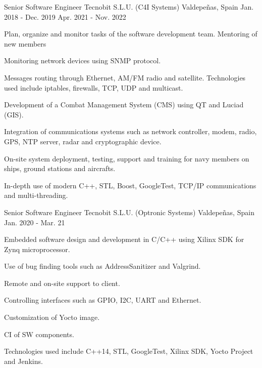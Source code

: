 

\begin{cventries}

  \cventry
    {Senior Software Engineer} %
    {Tecnobit S.L.U. (C4I Systems)} %
    {Valdepeñas, Spain} %
    {Jan. 2018 - Dec. 2019  \newline   Apr. 2021 - Nov. 2022} %
    {
      \begin{cvitems} %
        \item {Plan, organize and monitor tasks of the software development team. Mentoring of new members}
        \item {Monitoring network devices using SNMP protocol.}
        \item {Messages routing through Ethernet, AM/FM radio and satellite. Technologies used include iptables, firewalls, TCP, UDP and multicast.}
        \item {Development of a Combat Management System (CMS) using QT and Luciad (GIS).}
        \item {Integration of communications systems such as network controller, modem, radio, GPS, NTP server, radar and cryptographic device.}
        \item {On-site system deployment, testing, support and training for navy members on ships, ground stations and aircrafts.}
        \item {In-depth use of modern C++, STL, Boost, GoogleTest, TCP/IP communications and multi-threading.}
      \end{cvitems}
    }

  \cventry
    {Senior Software Engineer} %
    {Tecnobit S.L.U. (Optronic Systems)} %
    {Valdepeñas, Spain} %
    {Jan. 2020 - Mar. 21} %
    {
      \begin{cvitems} %
        \item {Embedded software design and development in C/C++ using Xilinx SDK for Zynq microprocessor.}
        \item {Use of bug finding tools such as AddressSanitizer and Valgrind. }
        \item {Remote and on-site support to client.}
        \item {Controlling interfaces such as GPIO,  I2C, UART and Ethernet.}
        \item {Customization of Yocto image.}
        \item {CI of SW components.}
        \item {Technologies used include C++14, STL, GoogleTest, Xilinx SDK, Yocto Project and Jenkins.}
      \end{cvitems}
    }


\end{cventries}
